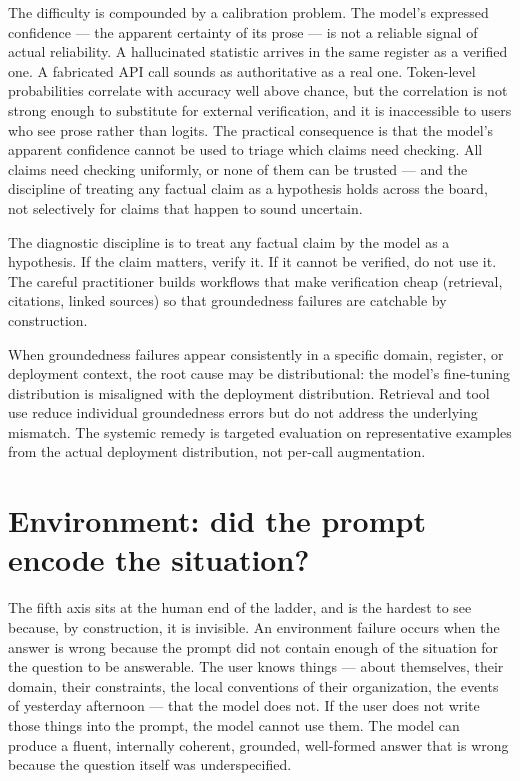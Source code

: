 \documentclass[11pt,a4paper]{article}
\begin{document}
The difficulty is compounded by a calibration problem. The model's
expressed confidence --- the apparent certainty of its prose --- is
not a reliable signal of actual reliability. A hallucinated
statistic arrives in the same register as a verified one. A
fabricated API call sounds as authoritative as a real one.
Token-level probabilities correlate with accuracy well above
chance, but the correlation is not strong enough to substitute for
external verification, and it is inaccessible to users who see
prose rather than logits. The practical consequence is that the
model's apparent confidence cannot be used to triage which claims
need checking. All claims need checking uniformly, or none of them
can be trusted --- and the discipline of treating any factual
claim as a hypothesis holds across the board, not selectively for
claims that happen to sound uncertain.

The diagnostic discipline is to treat any factual claim by the
model as a hypothesis. If the claim matters, verify it. If it
cannot be verified, do not use it. The careful practitioner builds
workflows that make verification cheap (retrieval, citations,
linked sources) so that groundedness failures are catchable by
construction.

When groundedness failures appear consistently in a specific
domain, register, or deployment context, the root cause may be
distributional: the model's fine-tuning distribution is
misaligned with the deployment distribution. Retrieval and tool
use reduce individual groundedness errors but do not address the
underlying mismatch. The systemic remedy is targeted evaluation on
representative examples from the actual deployment distribution,
not per-call augmentation.

\section*{Environment: did the prompt encode the situation?}

The fifth axis sits at the human end of the ladder, and is the
hardest to see because, by construction, it is invisible. An
environment failure occurs when the answer is wrong because the
prompt did not contain enough of the situation for the question to
be answerable. The user knows things --- about themselves, their
domain, their constraints, the local conventions of their
organization, the events of yesterday afternoon --- that the model
does not. If the user does not write those things into the prompt,
the model cannot use them. The model can produce a fluent,
internally coherent, grounded, well-formed answer that is wrong
because the question itself was underspecified.
\end{document}
